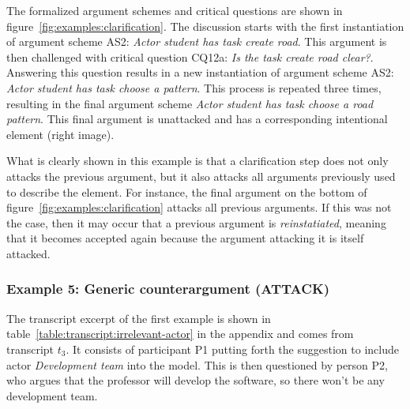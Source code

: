 The formalized argument schemes and critical questions are shown in figure~\ref{fig:examples:clarification}. The discussion starts with the first instantiation of argument scheme AS2: \emph{Actor student has task create road}. This argument is then challenged with critical question CQ12a: \emph{Is the task create road clear?}. Answering this question results in a new instantiation of argument scheme AS2: \emph{Actor student has task choose a pattern}. This process is repeated three times, resulting in the final argument scheme \emph{Actor student has task choose a road pattern}. This final argument is unattacked and has a corresponding intentional element (right image). 

What is clearly shown in this example is that a clarification step does not only attacks the previous argument, but it also attacks all arguments previously used to describe the element. For instance, the final argument on the bottom of figure~\ref{fig:examples:clarification} attacks all previous arguments. If this was not the case, then it may occur that a previous argument is \emph{reinstatiated}, meaning that it becomes accepted again because the argument attacking it is itself attacked.

\subsubsection{Example 5: Generic counterargument (ATTACK)}


The transcript excerpt of the first example is shown in table~\ref{table:transcript:irrelevant-actor} in the appendix and comes from transcript $t_3$. It consists of participant P1 putting forth the suggestion to include actor \emph{Development team} into the model. This is then questioned by person P2, who argues that the professor will develop the software, so there won't be any development team. 

